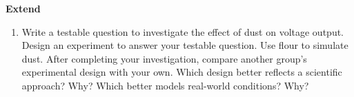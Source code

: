\documentclass[english,twoside]{article}
\begin{document}
\textbf{Extend}

\begin{enumerate}
	\item Write a testable question to investigate the effect of dust on voltage output. Design an experiment to answer your testable question. Use flour to simulate dust. After completing your investigation, compare another group's experimental design with your own. Which design better reflects a scientific approach? Why? Which better models real-world conditions? Why?
\end{enumerate}
\end{document}
